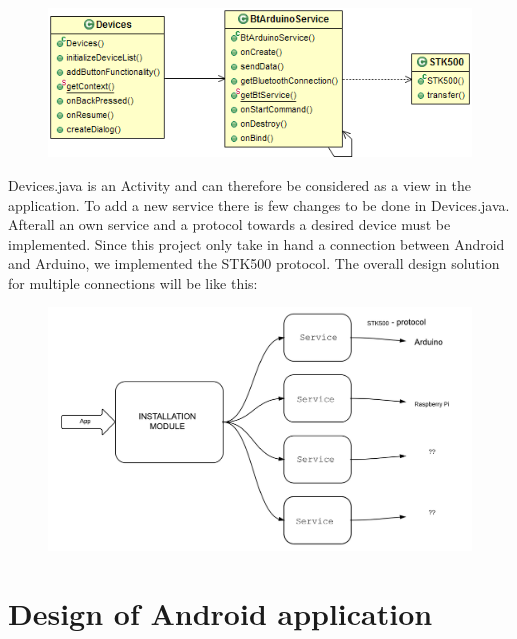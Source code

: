 	\begin{figure}[H]
	\centering
	\includegraphics[width=130mm]{images/BTConnection.png}
	\end{figure}

	Devices.java is an Activity and can therefore be considered as a view in the application. To add a new service there is few changes to be done in Devices.java. Afterall an own service and a protocol towards a desired device must be implemented. Since this project only take in hand a connection between Android and Arduino, we implemented the STK500 protocol.
	The overall design solution for multiple connections will be like this:\\

	\begin{figure}[H]
	\includegraphics[scale=0.2]{figures/OTAArchitecture.pdf}
	\end{figure}

\section{Design of Android application}


